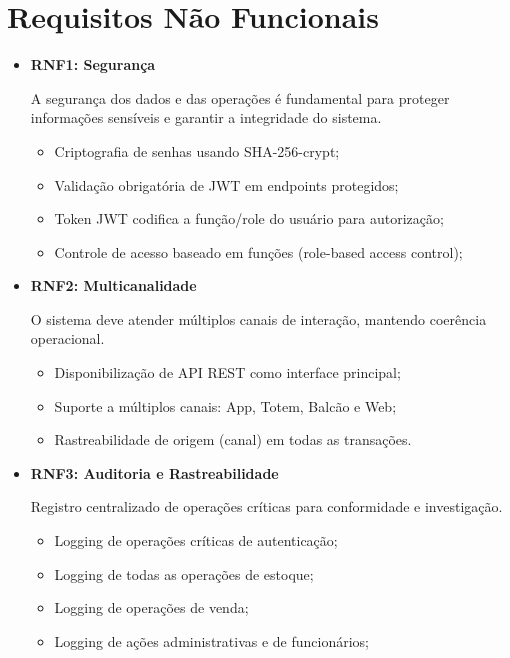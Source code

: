 \section{Requisitos Não Funcionais}

\begin{itemize}
  \item \textbf{RNF1: Segurança}

  A segurança dos dados e das operações é fundamental para proteger informações sensíveis e garantir a integridade do sistema.

  \begin{itemize}[topsep=0pt, itemsep=0pt]
    \item Criptografia de senhas usando SHA-256-crypt;
    \item Validação obrigatória de JWT em endpoints protegidos;
    \item Token JWT codifica a função/role do usuário para autorização;
    \item Controle de acesso baseado em funções (role-based access control);
  \end{itemize}
\end{itemize}

\begin{itemize}
  \item \textbf{RNF2: Multicanalidade}

  O sistema deve atender múltiplos canais de interação, mantendo coerência operacional.

  \begin{itemize}[topsep=0pt, itemsep=0pt]
    \item Disponibilização de API REST como interface principal;
    \item Suporte a múltiplos canais: App, Totem, Balcão e Web;
    \item Rastreabilidade de origem (canal) em todas as transações.
  \end{itemize}
\end{itemize}

\begin{itemize}
  \item \textbf{RNF3: Auditoria e Rastreabilidade}

  Registro centralizado de operações críticas para conformidade e investigação.

  \begin{itemize}[topsep=2pt, itemsep=2pt]
    \item Logging de operações críticas de autenticação;
    \item Logging de todas as operações de estoque;
    \item Logging de operações de venda;
    \item Logging de ações administrativas e de funcionários;
  \end{itemize}
\end{itemize}

